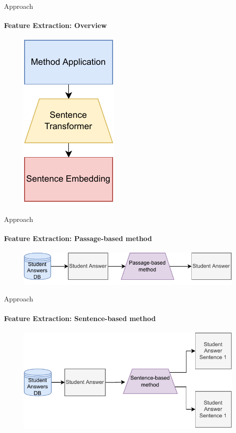 \documentclass[aspectratio=169]{beamer}
\begin{document}
\begin{frame}{Approach}
\framesubtitle{Feature Extraction: Overview}
\begin{figure}
	\centering
	\includegraphics[scale = 0.65]{images/feature_extraction.pdf}
	\label{fig:feature extraction}
\end{figure}
\end{frame}
\begin{frame}{Approach}
\framesubtitle{Feature Extraction: Passage-based method}
\begin{figure}
	\centering
	\includegraphics[scale = 0.65]{images/passage_FE_slides.pdf}
	\label{fig:passage fe slides}
\end{figure}
\end{frame}
\begin{frame}{Approach}
\framesubtitle{Feature Extraction: Sentence-based method}
\begin{figure}
	\centering
	\includegraphics[scale = 0.65]{images/sentence_FE_slides.pdf}
	\label{fig:sentence fe slides}
\end{figure}
\end{frame}
\end{document}
